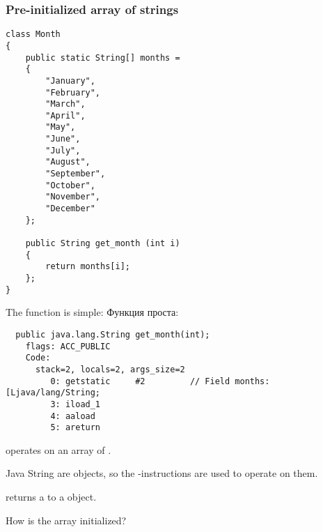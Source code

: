 \subsubsection{Pre-initialized array of strings}
\label{Java_2D_array_month}

\begin{lstlisting}
class Month
{
	public static String[] months = 
	{
		"January", 
		"February", 
		"March", 
		"April",
		"May",
		"June",
		"July",
		"August",
		"September",
		"October",
		"November",
		"December"
	};

	public String get_month (int i)
	{
		return months[i];
	};
} 
\end{lstlisting}

The  function is simple:
Функция  проста:

\begin{lstlisting}
  public java.lang.String get_month(int);
    flags: ACC_PUBLIC
    Code:
      stack=2, locals=2, args_size=2
         0: getstatic     #2         // Field months:[Ljava/lang/String;
         3: iload_1       
         4: aaload        
         5: areturn       
\end{lstlisting}

 operates on an array of .

Java String are objects, so the -instructions are used to operate on them.

 returns a  to a  object.


How is the  array initialized?


